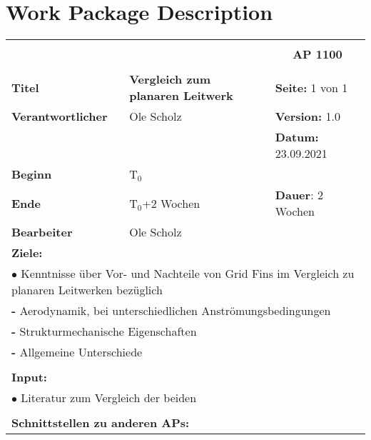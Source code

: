 \section{Work Package Description}
\label{sec:wpd}
\begin{table}[!h]
	\begin{center}
		\begin{tabular}{|p{35mm}||p{55mm}|p{50mm}||p{40mm}|}
			\hline
			\multicolumn{3}{|l||}{\textbf{}} & \multicolumn{1}{c|}{}\\
			\multicolumn{3}{|l||}{\textbf{}} & \multicolumn{1}{c|}{\textbf{AP 1100}}\\
			\multicolumn{3}{|l||}{\textbf{}} & \multicolumn{1}{c|}{}\\
			\hline\hline
			\textbf{Titel} & \multicolumn{2}{p{7cm}||}{\textbf{Vergleich zum planaren Leitwerk}} 
			& \textbf{Seite:} 1 von 1\\
			\hline
			\textbf{Verantwortlicher} & \multicolumn{2}{l||}{Ole Scholz} & \textbf{Version:} 1.0\\
			\hline
			\multicolumn{3}{|l||}{} & \textbf{Datum:} 23.09.2021\\
			\hline\hline
			\textbf{Beginn} & \multicolumn{2}{l||}{T$_0$} & \\
			\hline
			\textbf{Ende} & \multicolumn{2}{l||}{T$_0$+2 Wochen} & \textbf{Dauer}: 2 Wochen\\
			\hline\hline
			\textbf{Bearbeiter} & \multicolumn{3}{l|}{Ole Scholz}\\
			\hline\hline
			\multicolumn{4}{|p{150mm}|}{\textbf{Ziele:}}\\
			\multicolumn{4}{|p{150mm}|}{$\bullet$ Kenntnisse über Vor- und Nachteile von Grid Fins im Vergleich zu planaren Leitwerken bezüglich}\\
			\multicolumn{4}{|p{150mm}|}{\qquad \textbf{-} Aerodynamik, bei unterschiedlichen Anströmungsbedingungen}\\
			\multicolumn{4}{|p{150mm}|}{\qquad \textbf{-} Strukturmechanische Eigenschaften}\\
			\multicolumn{4}{|p{150mm}|}{\qquad \textbf{-} Allgemeine Unterschiede}\\
			\multicolumn{4}{|p{150mm}|}{}\\
			\multicolumn{4}{|p{150mm}|}{\textbf{Input:}}\\
			\multicolumn{4}{|p{150mm}|}{$\bullet$ Literatur zum Vergleich der beiden}\\
			\multicolumn{4}{|p{150mm}|}{}\\
			\multicolumn{4}{|p{150mm}|}{\textbf{Schnittstellen zu anderen APs:}}\\

\end{tabular}
\end{center}
\end{table}
